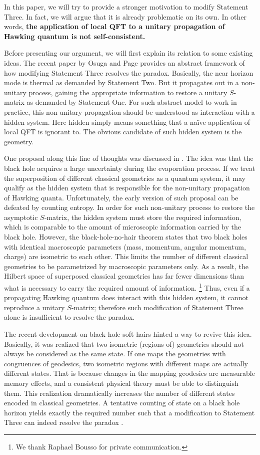\documentclass[aps,showpacs,onecolumn,floats,prd,superscriptaddress,nofootinbib]{revtex4-1}
\begin{document}
In this paper, we will try to provide a stronger motivation to modify Statement Three. 
In fact, we will argue that it is already problematic on its own. 
In other words, {\bf the application of local QFT to a unitary propagation of Hawking quantum is not self-consistent. } 

Before presenting our argument, we will first explain its relation to some existing ideas.
The recent paper by Osuga and Page \cite{OsuPag16} provides an abstract framework of how modifying Statement Three resolves the paradox.
Basically, the near horizon mode is thermal as demanded by Statement Two.
But it propagates out in a non-unitary process, gaining the appropriate information to restore a unitary $S$-matrix as demanded by Statement One. 
For such abstract model to work in practice, this non-unitary propagation should be understood as interaction with a hidden system.
Here hidden simply means something that a na\"ive application of local QFT is ignorant to.
The obvious candidate of such hidden system is the geometry.

One proposal along this line of thoughts was discussed in \cite{NomVar12}. 
The idea was that the black hole acquires a large uncertainty during the evaporation process. 
If we treat the superposition of different classical geometries as a quantum system, it may qualify as the hidden system that is responsible for the non-unitary propagation of Hawking quanta. 
Unfortunately, the early version of such proposal can be defeated by counting entropy.
In order for such non-unitary process to restore the asymptotic $S$-matrix, the hidden system must store the required information, which is comparable to the amount of microscopic information carried by the black hole.
However, the black-hole-no-hair theorem states that two black holes with identical macroscopic parameters (mass, momentum, angular momentum, charge) are isometric to each other. 
This limits the number of different classical geometries to be parametrized by macroscopic parameters only.
As a result, the Hilbert space of superposed classical geometries has far fewer dimensions than what is necessary to carry the required amount of information.
\footnote{We thank Raphael Bousso for private communication.}
Thus, even if a propagating Hawking quantum does interact with this hidden system, it cannot reproduce a unitary $S$-matrix; therefore such modification of Statement Three alone is insufficient to resolve the paradox.

The recent development on black-hole-soft-hairs \cite{HawPer16} hinted a way to revive this idea.
Basically, it was realized that two isometric (regions of) geometries should not always be considered as the same state.
If one maps the geometries with congruences of geodesics, two isometric regions with different maps are actually different states.
That is because changes in the mapping geodesics are measurable memory effects, and a consistent physical theory must be able to distinguish them.
This realization dramatically increases the number of different states encoded in classical geometries.
A tentative counting of state on a black hole horizon yields exactly the required number such that a modification to Statement Three can indeed resolve the paradox \cite{HawPer16}.
\end{document}
